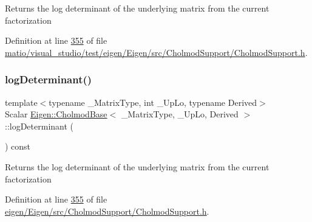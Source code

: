\begin{DoxyReturn}{Returns}
the log determinant of the underlying matrix from the current factorization 
\end{DoxyReturn}


Definition at line \hyperlink{matio_2visual__studio_2test_2eigen_2_eigen_2src_2_cholmod_support_2_cholmod_support_8h_source_l00355}{355} of file \hyperlink{matio_2visual__studio_2test_2eigen_2_eigen_2src_2_cholmod_support_2_cholmod_support_8h_source}{matio/visual\+\_\+studio/test/eigen/\+Eigen/src/\+Cholmod\+Support/\+Cholmod\+Support.\+h}.

\mbox{\label{class_eigen_1_1_cholmod_base_a597f7839a39604af18a8741a0d8c46bf}} 
\subsubsection{\texorpdfstring{log\+Determinant()}{logDeterminant()}\hspace{0.1cm}{\footnotesize\ttfamily [2/2]}}
{\footnotesize\ttfamily template$<$typename \+\_\+\+Matrix\+Type, int \+\_\+\+Up\+Lo, typename Derived$>$ \\
Scalar \hyperlink{class_eigen_1_1_cholmod_base}{Eigen\+::\+Cholmod\+Base}$<$ \+\_\+\+Matrix\+Type, \+\_\+\+Up\+Lo, Derived $>$\+::log\+Determinant (\begin{DoxyParamCaption}{ }\end{DoxyParamCaption}) const\hspace{0.3cm}{\ttfamily [inline]}}

\begin{DoxyReturn}{Returns}
the log determinant of the underlying matrix from the current factorization 
\end{DoxyReturn}


Definition at line \hyperlink{eigen_2_eigen_2src_2_cholmod_support_2_cholmod_support_8h_source_l00355}{355} of file \hyperlink{eigen_2_eigen_2src_2_cholmod_support_2_cholmod_support_8h_source}{eigen/\+Eigen/src/\+Cholmod\+Support/\+Cholmod\+Support.\+h}.

\mbox{\label{class_eigen_1_1_cholmod_base_a886fc102723ca7bde4ac7162dfd72f5d}} 
